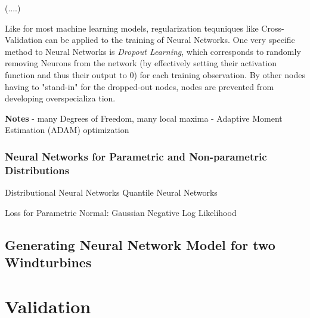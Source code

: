  (....) 
 
 

 
 Like for most machine learning models, regularization tequniques like Cross-Validation can be applied to the training of Neural Networks. One very specific method to Neural Networks is \textit{Dropout Learning}, which corresponds to randomly removing Neurons from the network (by effectively setting their activation function and thus their output to 0) for each training observation. By other nodes having to "stand-in" for the dropped-out nodes, nodes are prevented from developing overspecializa tion. \cite{James2023}


\textbf{Notes}
- many Degrees of Freedom, many local maxima
- Adaptive Moment Estimation (ADAM) optimization

\subsubsection{Neural Networks for Parametric and Non-parametric Distributions}


Distributional Neural Networks
Quantile Neural Networks

Loss for Parametric Normal: Gaussian Negative Log Likelihood


\subsection{Generating Neural Network Model for two Windturbines}

\section{Validation}